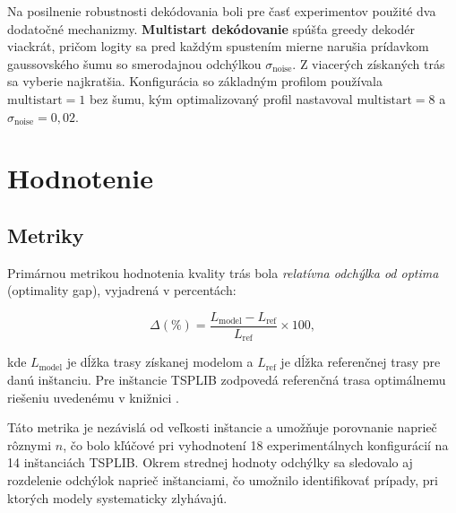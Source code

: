 \indent Na posilnenie robustnosti dekódovania boli pre časť experimentov
použité dva dodatočné mechanizmy. \textbf{Multistart dekódovanie}
spúšťa greedy dekodér viackrát, pričom logity sa pred každým spustením
mierne narušia prídavkom gaussovského šumu so smerodajnou odchýlkou
\(\sigma_\text{noise}\). Z viacerých získaných trás sa vyberie
najkratšia. Konfigurácia so základným profilom používala
\(\text{multistart} = 1\) bez šumu, kým optimalizovaný profil
nastavoval \(\text{multistart} = 8\) a \(\sigma_\text{noise} = 0{,}02\).

\section{Hodnotenie}
\label{sec:hodnotenie}

\subsection{Metriky}
\label{sec:metriky}

\indent Primárnou metrikou hodnotenia kvality trás bola \emph{relatívna
odchýlka od optima} (optimality gap), vyjadrená v percentách:

\begin{equation}
\Delta(\%) = \frac{L_\text{model} - L_\text{ref}}{L_\text{ref}} \times 100,
\label{eq:gap}
\end{equation}

\noindent kde \(L_\text{model}\) je dĺžka trasy získanej modelom
a \(L_\text{ref}\) je dĺžka referenčnej trasy pre danú inštanciu.
Pre inštancie TSPLIB zodpovedá referenčná trasa optimálnemu riešeniu
uvedenému v knižnici \parencite{reinelt1991tsplib}.

\begin{symboltable}
\end{symboltable}

\indent Táto metrika je nezávislá od veľkosti inštancie a umožňuje
porovnanie naprieč rôznymi \(n\), čo bolo kľúčové pri vyhodnotení
18 experimentálnych konfigurácií na 14 inštanciách TSPLIB. Okrem
strednej hodnoty odchýlky sa sledovalo aj rozdelenie odchýlok naprieč
inštanciami, čo umožnilo identifikovať prípady, pri ktorých modely
systematicky zlyhávajú.

